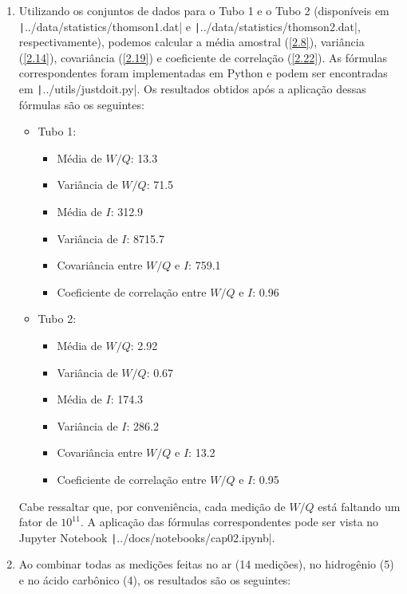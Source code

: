 \begin{enumerate}[label=\textbf{2.\arabic*.}]
	\item Utilizando os conjuntos de dados para o Tubo 1 e o Tubo 2 (disponíveis em \texttt|../data/statistics/thomson1.dat| e \texttt|../data/statistics/thomson2.dat|, respectivamente), podemos calcular a média amostral (\autoref{2.8}), variância (\autoref{2.14}), covariância (\autoref{2.19}) e coeficiente de correlação (\autoref{2.22}). As fórmulas correspondentes foram implementadas em Python e podem ser encontradas em \texttt|../utils/justdoit.py|. Os resultados obtidos após a aplicação dessas fórmulas são os seguintes:
	
	\begin{itemize}
		\item Tubo 1:
		\begin{itemize}
			\item Média de $W/Q$: 13.3
			\item Variância de $W/Q$: 71.5
			\item Média de $I$: 312.9
			\item Variância de $I$: 8715.7
			\item Covariância entre $W/Q$ e $I$: 759.1
			\item Coeficiente de correlação entre $W/Q$ e $I$: 0.96
		\end{itemize}
		
		\item Tubo 2:
		\begin{itemize}
			\item Média de $W/Q$: 2.92
			\item Variância de $W/Q$: 0.67
			\item Média de $I$: 174.3
			\item Variância de $I$: 286.2
			\item Covariância entre $W/Q$ e $I$: 13.2
			\item Coeficiente de correlação entre $W/Q$ e $I$: 0.95
		\end{itemize}
	\end{itemize}
	
	Cabe ressaltar que, por conveniência, cada medição de $W/Q$ está faltando um fator de $10^{11}$. A aplicação das fórmulas correspondentes pode ser vista no Jupyter Notebook \texttt|../docs/notebooks/cap02.ipynb|.
	
	\item Ao combinar todas as medições feitas no ar (14 medições), no hidrogênio (5) e no ácido carbônico (4), os resultados são os seguintes:
	

\end{enumerate}
